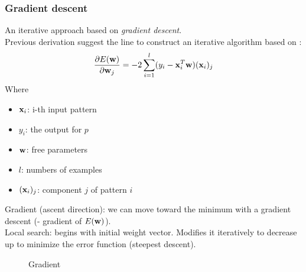 \documentclass[../main.tex]{subfiles}
\begin{document}
\subsubsection{Gradient descent}
An iterative approach based on  \emph{gradient descent}.\\
Previous derivation suggest the line to construct an iterative algorithm based on :
$$\frac{\partial E(\mathbf{w})}{\partial\mathbf{w}_j} = -2\sum_{i = 1}^{l} (y_i - \bold{x}_i^T\bold{w})(\bold{x}_i)_j$$
Where
\begin{itemize}
    \item $\bold{x}_i$: i-th input pattern
    \item $y_i$: the output for $p$
    \item $\bold{w}$: free parameters
    \item $l$: numbers of examples
    \item $(\bold{x}_i)_j$: component $j$ of pattern $i$
\end{itemize}
Gradient (ascent direction): we can move toward the minimum with a gradient descent (- gradient of $E(\bold{w})$).\\
Local search: begins with initial weight vector. Modifies it iteratively to decrease up to minimize the error function (steepest descent).
\begin{figure}[H]
  \centering
  \hfill
  \caption{Gradient}
\end{figure}
\end{document}
